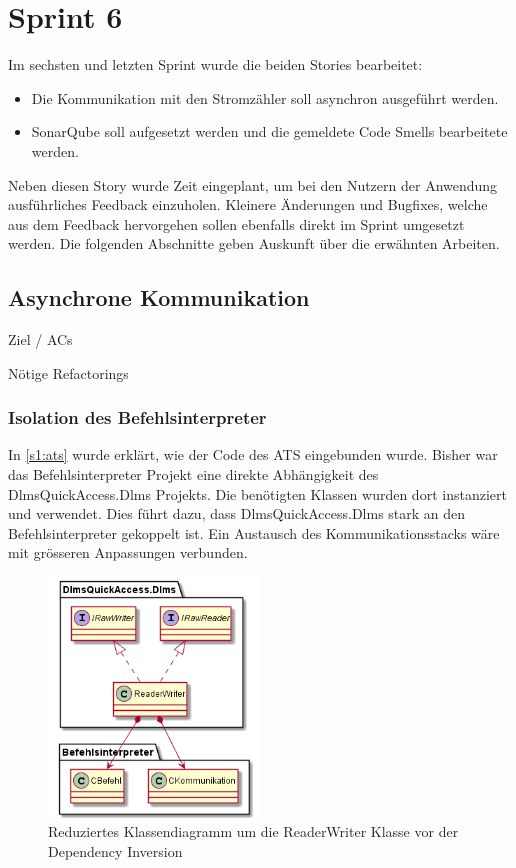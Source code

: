 \section{Sprint 6}
Im sechsten und letzten Sprint wurde die beiden Stories bearbeitet:
\begin{itemize}
   \item Die Kommunikation mit den Stromzähler soll asynchron ausgeführt werden.
   \item SonarQube soll aufgesetzt werden und die gemeldete Code Smells bearbeitete werden.
\end{itemize}
Neben diesen Story wurde Zeit eingeplant, um bei den Nutzern der Anwendung ausführliches Feedback einzuholen.
Kleinere Änderungen und Bugfixes, welche aus dem Feedback hervorgehen sollen ebenfalls direkt im Sprint umgesetzt werden.
Die folgenden Abschnitte geben Auskunft über die erwähnten Arbeiten.

\subsection{Asynchrone Kommunikation}

Ziel / ACs

Nötige Refactorings

\subsubsection{Isolation des Befehlsinterpreter}
In \ref{s1:ats} wurde erklärt, wie der Code des \ac{ATS} eingebunden wurde.
Bisher war das Befehlsinterpreter Projekt eine direkte Abhängigkeit des DlmsQuickAccess.Dlms Projekts.
Die benötigten Klassen wurden dort instanziert und verwendet. 
Dies führt dazu, dass DlmsQuickAccess.Dlms stark an den Befehlsinterpreter gekoppelt ist.
Ein Austausch des Kommunikationsstacks wäre mit grösseren Anpassungen verbunden.


\begin{figure}[H]
   \centering
   \includegraphics[width=0.5\textwidth]{gfx/dlms_vorher.png}
   \caption{
      Reduziertes Klassendiagramm um die ReaderWriter Klasse vor der Dependency Inversion
   }
   \label{fig:dlms_vorher}
\end{figure}

